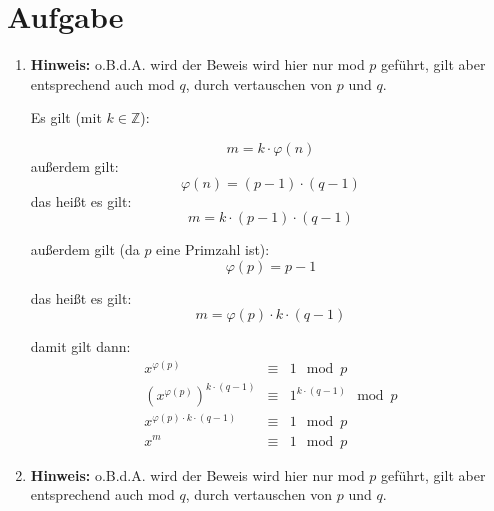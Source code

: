 \documentclass[DIN, pagenumber=false, fontsize=11pt, parskip=half]{scrartcl}
\begin{document}
    \section{Aufgabe}
    \begin{enumerate}[label=(\roman*)]
        \item
            \textbf{Hinweis:} o.B.d.A. wird der Beweis wird hier nur mod $p$ geführt,
            gilt aber entsprechend auch mod $q$, durch vertauschen von $p$ und $q$.

            Es gilt (mit $k \in \mathbb{Z}$):

            \begin{equation}
                m = k \cdot \varphi(n)
            \end{equation}
            außerdem gilt:
            \begin{equation}
                \varphi(n) = (p-1) \cdot (q-1)
            \end{equation}
            das heißt es gilt:
            \begin{equation}
                m = k \cdot (p-1) \cdot (q-1)
            \end{equation}
        
            außerdem gilt (da $p$ eine Primzahl ist):
            \begin{equation}
                \varphi(p) = p-1
            \end{equation}
        
            das heißt es gilt:
            \begin{equation}
                m = \varphi(p) \cdot k \cdot (q-1)
            \end{equation}

            damit gilt dann:
            \begin{eqnarray}
                x^{\varphi(p)} &\equiv& 1 \mod p \\
                {\left(x^{\varphi(p)}\right)}^{k \cdot (q-1)}  &\equiv& 1^{k \cdot (q-1)} \mod p \\
                x^{\varphi(p) \cdot k \cdot (q-1)} &\equiv& 1 \mod p \\
                x^m &\equiv& 1 \mod p \label{eq:a}
            \end{eqnarray}
        \item
            \textbf{Hinweis:} o.B.d.A. wird der Beweis wird hier nur mod $p$ geführt,
            gilt aber entsprechend auch mod $q$, durch vertauschen von $p$ und $q$.


\end{enumerate}
\end{document}
